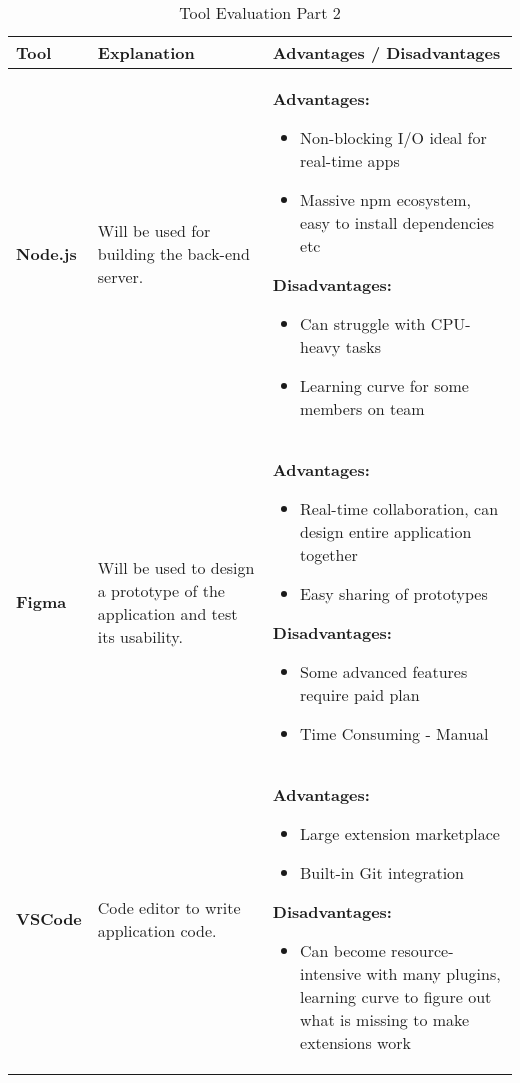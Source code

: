 \documentclass{article}
\begin{document}
\begin{table}[htbp]
  \caption{Tool Evaluation Part 2}
  \label{TblToolEval}
  \renewcommand{\arraystretch}{1.2}   %
  \setlength{\tabcolsep}{5pt}         %
  \begin{tabularx}{\textwidth}{p{2cm} p{4cm} X}
  \toprule
  \textbf{Tool} & \textbf{Explanation} & \textbf{Advantages / Disadvantages}\\
  \midrule

  \textbf{Node.js} 
  & Will be used for building the back-end server.
  & \textbf{Advantages:}
    \begin{itemize}
      \item Non-blocking I/O ideal for real-time apps
      \item Massive npm ecosystem, easy to install dependencies etc
    \end{itemize}
    \textbf{Disadvantages:}
    \begin{itemize}
      \item Can struggle with CPU-heavy tasks
      \item Learning curve for some members on team
    \end{itemize}
  \\
  \midrule

  \textbf{Figma} 
  & Will be used to design a prototype of the application and test its usability.
  & \textbf{Advantages:}
    \begin{itemize}
      \item Real-time collaboration, can design entire application together
      \item Easy sharing of prototypes
    \end{itemize}
    \textbf{Disadvantages:}
    \begin{itemize}
      \item Some advanced features require paid plan
      \item Time Consuming - Manual 
    \end{itemize}
  \\
  \midrule

  \textbf{VSCode} 
  & Code editor to write application code.
  & \textbf{Advantages:}
    \begin{itemize}
      \item Large extension marketplace
      \item Built-in Git integration
    \end{itemize}
    \textbf{Disadvantages:}
    \begin{itemize}
      \item Can become resource-intensive with many plugins, learning curve to figure out what is missing to make extensions work
    \end{itemize}
  \\
  \midrule


\end{tabularx}
\end{table}
\end{document}
